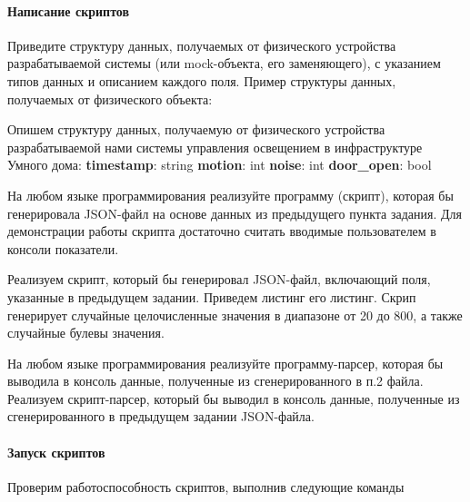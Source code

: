 \documentclass[a4paper,14pt]{extarticle}
\begin{document}
\paragraph{ Написание скриптов}
\begin{problem}
Приведите структуру данных, получаемых от физического устройства
разрабатываемой системы (или mock-объекта, его заменяющего), с указанием типов
данных и описанием каждого поля. Пример структуры данных, получаемых от
физического объекта:

\nonum
Опишем структуру данных, получаемую от физического устройства разрабатываемой нами системы управления освещением в инфраструктуре Умного дома:
\textbf{timestamp}: string
\textbf{motion}: int
\textbf{noise}: int
\textbf{door\_open}: bool
\end{problem} 

\begin{problem}
	На любом языке программирования реализуйте программу (скрипт), которая бы
	генерировала JSON-файл на основе данных из предыдущего пункта задания. Для
	демонстрации работы скрипта достаточно считать вводимые пользователем в
	консоли показатели.
	
	\nonum Реализуем скрипт, который бы генерировал JSON-файл, включающий поля, указанные в предыдущем задании. Приведем листинг его листинг. Скрип генерирует случайные целочисленные значения в диапазоне от 20 до 800, а также случайные булевы значения.

\end{problem}

\begin{problem}
	На любом языке программирования реализуйте программу-парсер, которая бы
	выводила в консоль данные, полученные из сгенерированного в п.2 файла.
	\nonum Реализуем скрипт-парсер, который бы выводил в консоль данные, полученные из сгенерированного в предыдущем задании JSON-файла. 
	
\end{problem}
	
	\paragraph{Запуск скриптов}
	
	Проверим работоспособность скриптов, выполнив следующие команды
	
\end{document}
